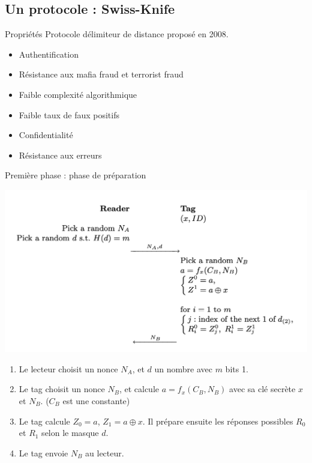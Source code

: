 \documentclass[aspectratio=169]{beamer}
\begin{document}
\subsection{Un protocole : Swiss-Knife}

\begin{frame}{Propriétés}
  Protocole délimiteur de distance proposé en 2008. \cite{SwissKnife}

  \bigskip

  \begin{itemize}
    \item Authentification
    \item Résistance aux mafia fraud et terrorist fraud
    \item Faible complexité algorithmique
    \item Faible taux de faux positifs
    \item Confidentialité
    \item Résistance aux erreurs
  \end{itemize}

\end{frame}


\begin{frame}{Première phase : phase de préparation}
  \begin{multicols}{2}
    \begin{minipage}[c]{\linewidth}
      \centering
      \bigskip
      \medskip
      \includegraphics[width=\linewidth]{assets/sk-phase1.png}
    \end{minipage}

    \begin{minipage}[t]{\linewidth}
      \begin{enumerate}
        \item Le lecteur choisit un nonce $N_A$, et $d$ un nombre avec $m$ bits 1.
        \item Le tag choisit un nonce $N_B$, et calcule $a = f_x(C_B, N_B)$ avec sa clé secrète $x$ et $N_B$. ($C_B$ est une constante)
        \item Le tag calcule $Z_0 = a$, $Z_1 = a \oplus x$. Il prépare ensuite les réponses possibles $R_0$ et $R_1$ selon le masque $d$.
        \item Le tag envoie $N_B$ au lecteur.
      \end{enumerate}
    \end{minipage}
  \end{multicols}
\end{frame}
\end{document}
